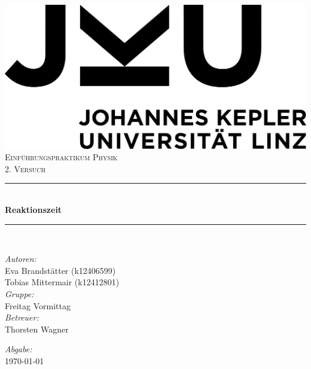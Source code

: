 \documentclass[a4paper,12pt]{article}
\begin{document}
\begin{titlepage}
    \centering
    \includegraphics[scale = 0.03]{bilder/JKU_Logo.png}\\[1.0 cm]	%
    \textsc{\Large Einführungspraktikum Physik}\\[0.5 cm]	        %
    \textsc{\large 2. Versuch}\\[0.5 cm]				            %
    \rule{\linewidth}{0.4 mm} \\[0.4 cm]
    { \huge \bfseries Reaktionszeit}\\                              %
    \rule{\linewidth}{0.4 mm} \\[1.5 cm]
    \begin{minipage}{0.8\textwidth}
        \begin{flushleft} \large
            \emph{Autoren:}\\
            Eva Brandstätter (k12406599)\\
            Tobias Mittermair (k12412801)\\
            \vspace{1cm}
            \emph{Gruppe:}\\
            Freitag Vormittag\\
            \vspace{1cm}
            \emph{Betreuer:}\\
            Thorsten Wagner
        \end{flushleft}
        \begin{flushright} \large
            \vspace{8cm}
            \emph{Abgabe:} \\
            \today
        \end{flushright}
    \end{minipage}~    
\end{titlepage}
\end{document}
